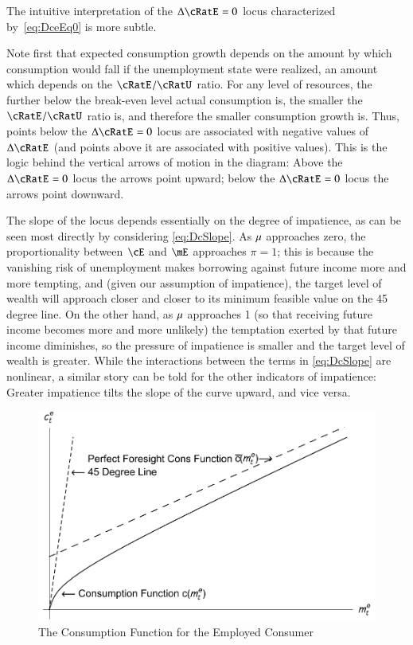 \documentclass[titlepage,abstract]{\econtex}\newcommand{\texname}{ctDiscrete}
\begin{document}
The intuitive interpretation of the $\Delta \cRatE_{\tSS}=0$ locus characterized by~\eqref{eq:DceEq0} is  more subtle. 

Note first that expected consumption growth depends on the amount by
which consumption would fall if the unemployment state were realized,
an amount which depends on the $\cRatE_{\tSS}/\cRatU_{\tSS}$
ratio. For any level of resources, the further below the break-even
level actual consumption is, the smaller the
$\cRatE_{\tSS}/\cRatU_{\tSS}$ ratio is, and therefore the smaller
consumption growth is. Thus, points below the $\Delta \cRatE_{\tSS}=0$
locus are associated with negative values of $\Delta \cRatE_{\tSS}$
(and points above it are associated with positive values). This is the
logic behind the vertical arrows of motion in the diagram: Above the
$\Delta \cRatE_{\tSS}=0$ locus the arrows point upward; below the
$\Delta \cRatE_{\tSS}=0$ locus the arrows point downward.

The slope of the locus depends essentially on the degree of
impatience, as can be seen most directly by considering
\eqref{eq:DcSlope}.  As $\mu$ approaches zero, the proportionality
between $\cE$ and $\mE$ approaches $\pi=1$; this is because the
vanishing risk of unemployment makes borrowing against future income
more and more tempting, and (given our assumption of impatience), the
target level of wealth will approach closer and closer to its minimum
feasible value on the 45 degree line.  On the other hand, as $\mu$
approaches 1 (so that receiving future income becomes more and more
unlikely) the temptation exerted by that future income diminishes, so
the pressure of impatience is smaller and the target level of wealth
is greater.  While the interactions between the terms in
\eqref{eq:DcSlope} are nonlinear, a similar story can be told for the
other indicators of impatience: Greater impatience tilts the slope of
the curve upward, and vice versa.

\begin{figure}
\caption{The Consumption Function for the Employed Consumer}\label{fig:cFunc}
\includegraphics{./Figures/TractableBufferStockcFunc}
\end{figure}
\end{document}
